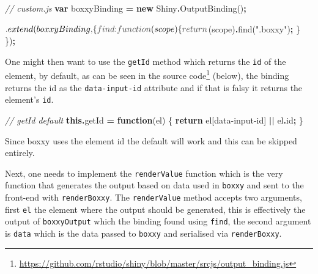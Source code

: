 \documentclass[
]{krantz}
\makeatletter
\newenvironment{Shaded}{\begin{snugshade}}{\end{snugshade}}
\newcommand{\AttributeTok}[1]{\textcolor[rgb]{0.61,0.61,0.61}{#1}}
\newcommand{\CommentTok}[1]{\textcolor[rgb]{0.37,0.37,0.37}{\textit{#1}}}
\newcommand{\ControlFlowTok}[1]{\textcolor[rgb]{0.27,0.27,0.27}{\textbf{#1}}}
\newcommand{\DataTypeTok}[1]{\textcolor[rgb]{0.27,0.27,0.27}{#1}}
\newcommand{\FunctionTok}[1]{\textcolor[rgb]{0,0,0}{#1}}
\newcommand{\KeywordTok}[1]{\textcolor[rgb]{0.27,0.27,0.27}{\textbf{#1}}}
\newcommand{\NormalTok}[1]{#1}
\newcommand{\OperatorTok}[1]{\textcolor[rgb]{0.43,0.43,0.43}{\textbf{#1}}}
\newcommand{\StringTok}[1]{\textcolor[rgb]{0.5,0.5,0.5}{#1}}
\renewcommand{\href}[2]{#2\footnote{\url{#1}}}
\newenvironment{kframe}{%
\medskip{}
\setlength{\fboxsep}{.8em}
 \def\at@end@of@kframe{}%
 \ifinner\ifhmode%
  \def\at@end@of@kframe{\end{minipage}}%
  \begin{minipage}{\columnwidth}%
 \fi\fi%
 \def\FrameCommand##1{\hskip\@totalleftmargin \hskip-\fboxsep
 \colorbox{shadecolor}{##1}\hskip-\fboxsep
     \hskip-\linewidth \hskip-\@totalleftmargin \hskip\columnwidth}%
 \MakeFramed {\advance\hsize-\width
   \@totalleftmargin\z@ \linewidth\hsize
   \@setminipage}}%
 {\par\unskip\endMakeFramed%
 \at@end@of@kframe}
\renewenvironment{Shaded}{\begin{kframe}}{\end{kframe}}
\makeatother
\begin{document}
\begin{Shaded}
\begin{Highlighting}[]
\CommentTok{// custom.js}
\KeywordTok{var}\NormalTok{ boxxyBinding }\OperatorTok{=} \KeywordTok{new}\NormalTok{ Shiny}\OperatorTok{.}\FunctionTok{OutputBinding}\NormalTok{()}\OperatorTok{;}

\NormalTok{$}\OperatorTok{.}\FunctionTok{extend}\NormalTok{(boxxyBinding}\OperatorTok{,}\NormalTok{ \{}
  \DataTypeTok{find}\OperatorTok{:} \KeywordTok{function}\NormalTok{(scope) \{}
    \ControlFlowTok{return}\NormalTok{ $(scope)}\OperatorTok{.}\FunctionTok{find}\NormalTok{(}\StringTok{".boxxy"}\NormalTok{)}\OperatorTok{;}
\NormalTok{  \}}
\NormalTok{\})}\OperatorTok{;}
\end{Highlighting}
\end{Shaded}

One might then want to use the \texttt{getId} method which returns the \texttt{id} of the element, by default, as can be seen in the \href{https://github.com/rstudio/shiny/blob/master/srcjs/output_binding.js}{source code} (below), the binding returns the id as the \texttt{data-input-id} attribute and if that is falsy it returns the element's \texttt{id}.

\begin{Shaded}
\begin{Highlighting}[]
\CommentTok{// getId default}
\KeywordTok{this}\OperatorTok{.}\AttributeTok{getId} \OperatorTok{=} \KeywordTok{function}\NormalTok{(el) \{}
  \ControlFlowTok{return}\NormalTok{ el[}\StringTok{\textquotesingle{}data{-}input{-}id\textquotesingle{}}\NormalTok{] }\OperatorTok{||}\NormalTok{ el}\OperatorTok{.}\AttributeTok{id}\OperatorTok{;}
\NormalTok{\}}
\end{Highlighting}
\end{Shaded}

Since boxxy uses the element id the default will work and this can be skipped entirely.

Next, one needs to implement the \texttt{renderValue} function which is the very function that generates the output based on data used in \texttt{boxxy} and sent to the front-end with \texttt{renderBoxxy}. The \texttt{renderValue} method accepts two arguments, first \texttt{el} the element where the output should be generated, this is effectively the output of \texttt{boxxyOutput} which the binding found using \texttt{find}, the second argument is \texttt{data} which is the data passed to \texttt{boxxy} and serialised via \texttt{renderBoxxy}.
\end{document}
